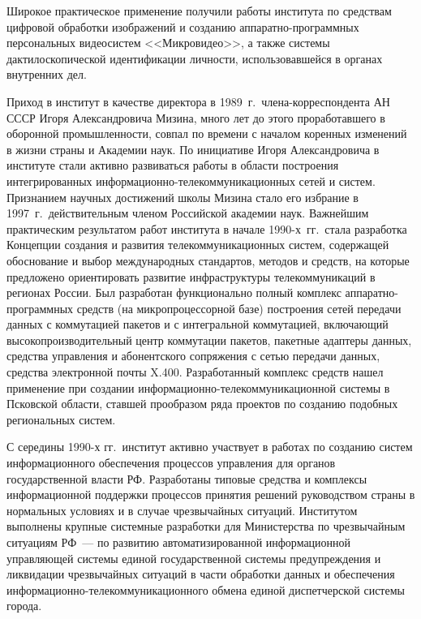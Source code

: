 \begin{multicols}{2}
{}

     Широкое практическое применение получили работы
института по средствам цифровой обработки изображений и
созданию ап\-па\-рат\-но-про\-грам\-мных персональных видеосистем
<<Микровидео>>, а также системы дактилоскопической
идентификации личности, использовавшейся в органах внут\-рен\-них
дел.

Приход в институт в качестве директора в 1989~г.\ 
члена-корреспондента АН СССР Игоря Александровича Мизина, много
лет до этого проработавшего в оборонной промышленности, совпал
по времени с началом коренных изменений в жизни страны и
Академии наук. По инициативе Игоря Александровича в институте
стали активно развиваться работы в области построения
интегрированных ин\-фор\-ма\-ци\-он\-но-те\-ле\-ком\-му\-ни\-ка\-ци\-он\-ных сетей и
систем. Признанием научных дости\-же\-ний школы Мизина стало его
избрание в 1997~г.\ действительным членом Российской академии
наук. Важнейшим практическим результатом работ института в
начале 1990-х~гг.\ стала разработка Концепции создания и развития
телекоммуникационных систем, содержащей обоснование и выбор
международных стандартов, методов и средств, на которые
предложено ориентировать развитие инфра\-струк\-ту\-ры
телекоммуникаций в регионах России. Был разработан
функционально полный комп\-лекс ап\-па\-рат\-но-про\-грам\-мных средств
(на %
 мик\-ро\-про\-цес\-сор\-ной базе) построения сетей пере\-да\-чи данных с
коммутацией пакетов и с интегральной коммутацией, включающий
высокопроизводительный центр коммутации пакетов, пакетные
адаптеры данных, средства управления и абонентского сопряжения с
сетью пе\-ре\-да\-чи данных, средства электронной поч\-ты X.400.
Разработанный комплекс средств нашел применение при создании
ин\-фор\-ма\-ци\-он\-но-те\-ле\-ком\-му\-ни\-ка\-ци\-он\-ной сис\-те\-мы в Псковской
области, ставшей прообразом ряда проектов по созданию подобных
региональных сис\-тем.
{

}

     С середины 1990-х гг.\ институт активно участвует в работах
по созданию систем информационного обеспечения процессов
управления для органов государственной власти РФ. Разработаны
типовые средства и комплексы информационной поддержки
процессов принятия решений руководством страны в нормальных
условиях и в случае чрезвычайных ситуаций. Институтом
вы\-пол\-нены крупные системные разработки для Министерства по
чрезвычайным ситуациям РФ~--- по %
 развитию автоматизированной
информационной управ\-ля\-ющей сис\-те\-мы единой государственной
сис\-те\-мы предупреждения и ликвидации чрезвычайных ситуаций в
час\-ти обработки данных и обеспечения ин\-фор\-ма\-ци\-он\-но-те\-ле\-ком\-му\-ни\-ка\-ци\-он\-но\-го 
обмена единой диспетчерской системы города.


\end{multicols}
